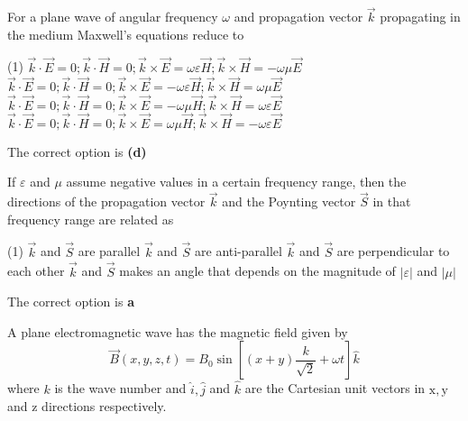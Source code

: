  \begin{enumerate}
	\begin{minipage}{\textwidth}
		\item For a plane wave of angular frequency $\omega$ and propagation vector $\vec{k}$ propagating in the medium Maxwell's equations reduce to
	\end{minipage}
	\begin{tasks}(1)
		\task[\textbf{A.}] $\vec{k} \cdot \vec{E}=0 ; \vec{k} \cdot \vec{H}=0 ; \vec{k} \times \vec{E}=\omega \varepsilon \vec{H} ; \vec{k} \times \vec{H}=-\omega \mu \vec{E}$ 
		\task[\textbf{B.}]$\vec{k} \cdot \vec{E}=0 ; \vec{k} \cdot \vec{H}=0 ; \vec{k} \times \vec{E}=-\omega \varepsilon \vec{H} ; \vec{k} \times \vec{H}=\omega \mu \vec{E}$
		\task[\textbf{C.}]$\vec{k} \cdot \vec{E}=0 ; \vec{k} \cdot \vec{H}=0 ; \vec{k} \times \vec{E}=-\omega \mu \vec{H} ; \vec{k} \times \vec{H}=\omega \varepsilon \vec{E}$
		\task[\textbf{D.}]$\vec{k} \cdot \vec{E}=0 ; \vec{k} \cdot \vec{H}=0 ; \vec{k} \times \vec{E}=\omega \mu \vec{H} ; \vec{k} \times \vec{H}=-\omega \varepsilon \vec{E}$
	\end{tasks}
	\begin{answer}
		The correct option is \textbf{(d)}
	\end{answer}
	\begin{minipage}{\textwidth}
		\item If $\varepsilon$ and $\mu$ assume negative values in a certain frequency range, then the directions of the propagation vector $\vec{k}$ and the Poynting vector $\vec{S}$ in that frequency range are related as
	\end{minipage}
	\begin{tasks}(1)
		\task[\textbf{A.}] $\vec{k}$ and $\vec{S}$ are parallel
		\task[\textbf{B.}]$\vec{k}$ and $\vec{S}$ are anti-parallel
		\task[\textbf{C.}]$\vec{k}$ and $\vec{S}$ are perpendicular to each other
		\task[\textbf{D.}]$\vec{k}$ and $\vec{S}$ makes an angle that depends on the magnitude of $|\varepsilon|$ and $|\mu|$
	\end{tasks}
	\begin{answer}
		The correct option is \textbf{a}	
	\end{answer}
	\begin{minipage}{\textwidth}
		\item A plane electromagnetic wave has the magnetic field given by
		$$
		\vec{B}(x, y, z, t)=B_{0} \sin \left[(x+y) \frac{k}{\sqrt{2}}+\omega t\right] \hat{k}
		$$
		where $k$ is the wave number and $\hat{i}, \hat{j}$ and $\hat{k}$ are the Cartesian unit vectors in $\mathrm{x}, \mathrm{y}$ and $\mathrm{z}$ directions respectively.

\end{minipage}
\end{enumerate}
